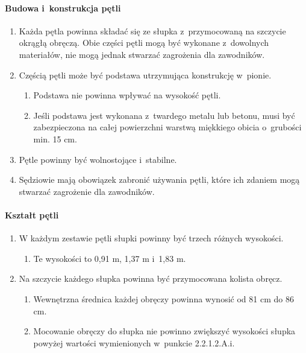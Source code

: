 \documentclass[12pt]{article}
\begin{document}
\paragraph{Budowa i~konstrukcja pętli}
\begin{enumerate}
	\item Każda pętla powinna składać się ze słupka z~przymocowaną na szczycie
	      okrągłą obręczą. Obie części pętli mogą być wykonane z~dowolnych
	      materiałów, nie mogą jednak stwarzać zagrożenia dla zawodników.

	\item Częścią pętli może być podstawa utrzymująca konstrukcję w~pionie.
	      \begin{enumerate}
		      \item Podstawa nie powinna wpływać na wysokość pętli.

		      \item Jeśli podstawa jest wykonana z~twardego metalu lub betonu, musi być
		            zabezpieczona na całej powierzchni warstwą miękkiego obicia o~grubości
		            min. 15 cm.
	      \end{enumerate}

	\item Pętle powinny być wolnostojące i~stabilne.

	\item Sędziowie mają obowiązek zabronić używania pętli, które ich zdaniem
	      mogą stwarzać zagrożenie dla zawodników.
\end{enumerate}

\paragraph{Kształt pętli}
\begin{enumerate}
	\item W każdym zestawie pętli słupki powinny być trzech różnych wysokości.
	      \begin{enumerate}
		      \item Te wysokości to 0,91 m, 1,37 m i~1,83 m.
	      \end{enumerate}
	\item Na szczycie każdego słupka powinna być przymocowana kolista obręcz.
	      \begin{enumerate}
		      \item Wewnętrzna średnica każdej obręczy powinna wynosić od 81 cm do 86 cm.

		      \item Mocowanie obręczy do słupka nie powinno zwiększyć wysokości słupka
		            powyżej wartości wymienionych w~punkcie 2.2.1.2.A.i.
	      \end{enumerate}
\end{enumerate}
\end{document}
